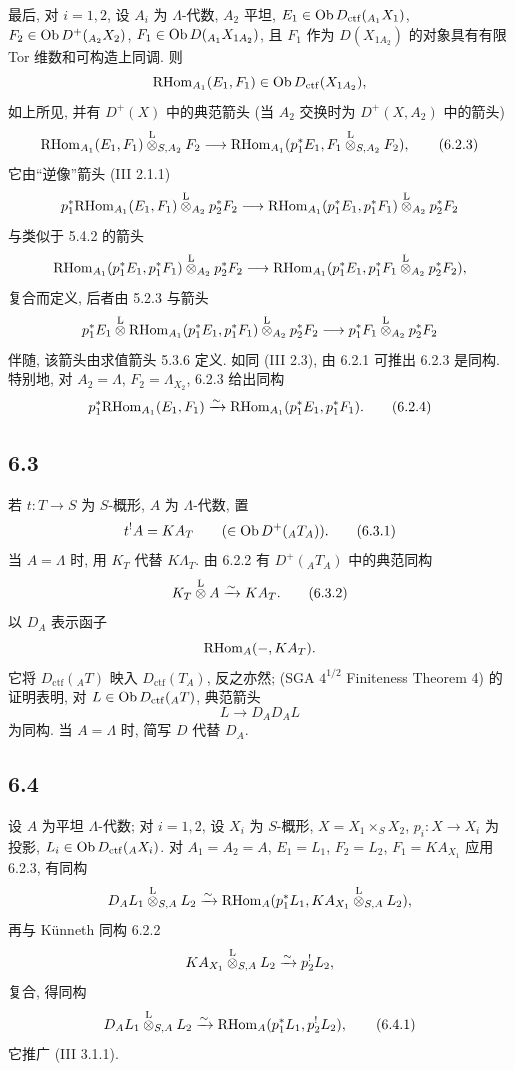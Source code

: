 最后, 对 $i=1,2$, 设 $A_i$ 为 $\Lambda$-代数, $A_2$ 平坦, $E_1\in\operatorname{Ob} D_{\mathrm{ctf}}({}_{A_1}X_1)$, $F_2\in\operatorname{Ob} D^+({}_{A_2}X_2)$, $F_1\in\operatorname{Ob} D({}_{A_1}X_{1A_2})$, 且 $F_1$ 作为 $D(X_{1A_2})$ 的对象具有有限 Tor 维数和可构造上同调. 则
\[
\mathrm{RHom}_{A_1}(E_1,F_1)\in\operatorname{Ob} D_{\mathrm{ctf}}(X_{1A_2}),
\]
如上所见, 并有 $D^+(X)$ 中的典范箭头 (当 $A_2$ 交换时为 $D^+(X,A_2)$ 中的箭头)
\begin{equation}
\mathrm{RHom}_{A_1}(E_1,F_1)\overset{\mathrm L}{\otimes}_{S,A_2}F_2
\longrightarrow
\mathrm{RHom}_{A_1}(p_1^*E_1,F_1\overset{\mathrm L}{\otimes}_{S,A_2}F_2),
\tag{6.2.3}
\end{equation}
它由``逆像''箭头 (III 2.1.1)
\[
p_1^*\mathrm{RHom}_{A_1}(E_1,F_1)\overset{\mathrm L}{\otimes}_{A_2}p_2^*F_2
\longrightarrow
\mathrm{RHom}_{A_1}(p_1^*E_1,p_1^*F_1)\overset{\mathrm L}{\otimes}_{A_2}p_2^*F_2
\]
与类似于 5.4.2 的箭头
\[
\mathrm{RHom}_{A_1}(p_1^*E_1,p_1^*F_1)\overset{\mathrm L}{\otimes}_{A_2}p_2^*F_2
\longrightarrow
\mathrm{RHom}_{A_1}(p_1^*E_1,p_1^*F_1\overset{\mathrm L}{\otimes}_{A_2}p_2^*F_2),
\]
复合而定义, 后者由 5.2.3 与箭头
\[
p_1^*E_1\overset{\mathrm L}{\otimes}\mathrm{RHom}_{A_1}(p_1^*E_1,p_1^*F_1)\overset{\mathrm L}{\otimes}_{A_2}p_2^*F_2
\longrightarrow
p_1^*F_1\overset{\mathrm L}{\otimes}_{A_2}p_2^*F_2
\]
伴随, 该箭头由求值箭头 5.3.6 定义. 如同 (III 2.3), 由 6.2.1 可推出 6.2.3 是同构. 特别地, 对 $A_2=\Lambda$, $F_2=\Lambda_{X_2}$, 6.2.3 给出同构
\begin{equation}
p_1^*\mathrm{RHom}_{A_1}(E_1,F_1)
\xrightarrow{\sim}
\mathrm{RHom}_{A_1}(p_1^*E_1,p_1^*F_1).
\tag{6.2.4}
\end{equation}

\subsection*{6.3}
若 $t:T\to S$ 为 $S$-概形, $A$ 为 $\Lambda$-代数, 置
\begin{equation}
t^!A = KA_T \qquad(\in\operatorname{Ob} D^+({}_AT_A)).
\tag{6.3.1}
\end{equation}
当 $A=\Lambda$ 时, 用 $K_T$ 代替 $K\Lambda_T$. 由 6.2.2 有 $D^+({}_AT_A)$ 中的典范同构
\begin{equation}
K_T\overset{\mathrm L}{\otimes} A\xrightarrow{\sim}KA_T.
\tag{6.3.2}
\end{equation}
以 $D_A$ 表示函子
\[
\mathrm{RHom}_A(-,KA_T).
\]
它将 $D_{\mathrm{ctf}}({}_AT)$ 映入 $D_{\mathrm{ctf}}(T_A)$, 反之亦然; (SGA $4^{1/2}$ Finiteness Theorem 4) 的证明表明, 对 $L\in\operatorname{Ob} D_{\mathrm{ctf}}({}_AT)$, 典范箭头
\[
L\longrightarrow D_AD_AL
\]
为同构. 当 $A=\Lambda$ 时, 简写 $D$ 代替 $D_A$.

\subsection*{6.4}
设 $A$ 为平坦 $\Lambda$-代数; 对 $i=1,2$, 设 $X_i$ 为 $S$-概形, $X=X_1\times_SX_2$, $p_i:X\to X_i$ 为投影, $L_i\in\operatorname{Ob} D_{\mathrm{ctf}}({}_AX_i)$. 对 $A_1=A_2=A$, $E_1=L_1$, $F_2=L_2$, $F_1=KA_{X_1}$ 应用 6.2.3, 有同构
\[
D_A L_1\overset{\mathrm L}{\otimes}_{S,A}L_2
\xrightarrow{\sim}
\mathrm{RHom}_A(p_1^*L_1,KA_{X_1}\overset{\mathrm L}{\otimes}_{S,A}L_2),
\]
再与 Künneth 同构 6.2.2
\[
KA_{X_1}\overset{\mathrm L}{\otimes}_{S,A}L_2\xrightarrow{\sim}p_2^!L_2,
\]
复合, 得同构
\begin{equation}
D_AL_1\overset{\mathrm L}{\otimes}_{S,A}L_2
\xrightarrow{\sim}
\mathrm{RHom}_A(p_1^*L_1,p_2^!L_2),
\tag{6.4.1}
\end{equation}
它推广 (III 3.1.1).

